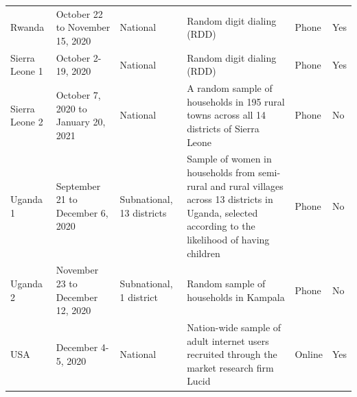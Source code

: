 \documentclass[
  12pt,
]{article}
\begin{document}
\begin{landscape}
\begin{table}[!h]
{\begin{tabular}[t]{>{\raggedright\arraybackslash}p{8em}>{\raggedright\arraybackslash}p{8em}>{\raggedright\arraybackslash}p{12em}>{\raggedright\arraybackslash}p{30em}ll}
Rwanda & October 22 to November 15, 2020 & National & Random digit dialing (RDD) & Phone & Yes\\
Sierra Leone 1 & October 2-19, 2020 & National & Random digit dialing (RDD) & Phone & Yes\\
Sierra Leone 2 & October 7, 2020 to January 20, 2021 & National & A random sample of households in 195 rural towns across all 14 districts of Sierra Leone & Phone & No\\
Uganda 1 & September 21 to December 6, 2020 & Subnational, 13 districts & Sample of women in households from semi-rural and rural villages across 13 districts in Uganda, selected according to the likelihood of having children & Phone & No\\
Uganda 2 & November 23 to December 12, 2020 & Subnational, 1 district & Random sample of households in Kampala & Phone & No\\
USA & December 4-5, 2020 & National & Nation-wide sample of adult internet users recruited through the market research firm Lucid & Online & Yes\\
\bottomrule
\end{tabular}}
\end{table}
\end{landscape}

\newpage
\end{document}
